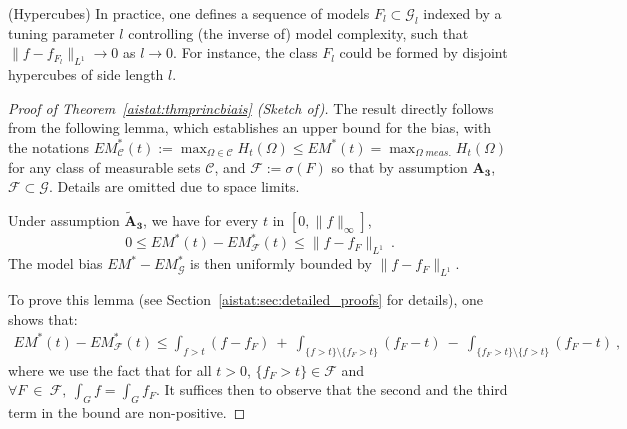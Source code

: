 \begin{remark}{\sc (Hypercubes)}
In practice, one defines a sequence of models $F_l\subset\mathcal{G}_l$ indexed by a tuning parameter $l$ controlling (the inverse of) model complexity, such that $\|f-f_{F_l}\|_{L^1} \rightarrow 0$ as $l \rightarrow 0$. %
For instance, the class $F_l$ could be formed by disjoint hypercubes of side length $l$.
\end{remark}

\begin{proof}[Proof of Theorem~\ref{aistat:thmprincbiais} (Sketch of)]
The result directly follows from the following lemma, which establishes an upper bound for the bias, with the notations $EM_{\mathcal{C}}^*(t):=\max_{\Omega \in \mathcal{C}}H_t(\Omega) \le EM^*(t)=\max_{\Omega\; meas.}H_t(\Omega)$ for any class of measurable sets $\mathcal{C}$, and $\mathcal{F}:= \sigma(F)$ so that by assumption $\mathbf{A_3}$, $\mathcal{F} \subset \mathcal{G}$. Details are omitted due to space limits.\\

\begin{lemma} 
\label{aistat:propbiais}
Under assumption $\mathbf{\tilde A_3}$,  we have for every $t$ in $[0,\|f\|_\infty]$, $$0\le EM^*(t)-EM^*_{\mathcal{F}}(t) \le \|f-f_{F}\|_{L^1}~. $$ The model bias $EM^*-EM^*_{\mathcal{G}}$ is then uniformly bounded by $\|f-f_{F}\|_{L^1}$.
\end{lemma}

To prove this lemma (see Section~\ref{aistat:sec:detailed_proofs} for details), one shows that:
\begin{align*}
EM^*(t)-EM^*_{\mathcal{F}}(t) \le \int_{f>t}(f-f_{F}) ~+~ \int_{\{f>t\}\setminus \{f_{F}>t\}}(f_{F}-t) ~-~\int_{\{f_{F}>t\} \setminus \{f>t\}}(f_{F}-t)~,
\end{align*}
where we use the fact that for all $t>0$, $\{ f_{F} > t \} \in \mathcal{F}$ and $\forall F~ \in~ \mathcal{F},~ \int_Gf=\int_Gf_{F}$.
It suffices then to observe that the second and the third term in the bound are non-positive.
\end{proof}


